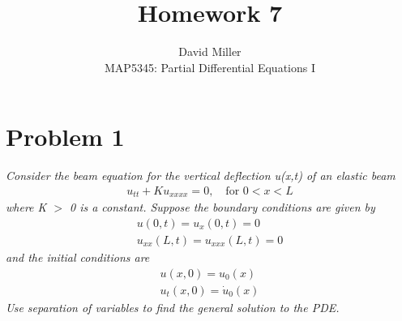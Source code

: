 \documentclass[12pt]{article}
\theoremstyle{remark}
\begin{document}
 
\title{Homework 7}
\author{David Miller \\ 
MAP5345: Partial Differential Equations I} 
 
\maketitle

\section*{Problem 1}

\textit{Consider the beam equation for the vertical deflection u(x,t) of an elastic beam}
\begin{align}
	u_{tt} + Ku_{xxxx} = 0, \quad \text{for } 0 < x < L
\end{align}
\textit{where K $>$ 0 is a constant. Suppose the boundary conditions are given by}
\begin{align}
	u(0,t) = u_x(0,t) = 0 \\
	u_{xx}(L,t) = u_{xxx}(L,t) = 0
\end{align}
\textit{and the initial conditions are}
\begin{align}
	u(x,0) = u_0(x) \\
	u_t(x,0) = \dot{u}_0(x)
\end{align}
\textit{Use separation of variables to find the general solution to the PDE.} \\
\end{document}
